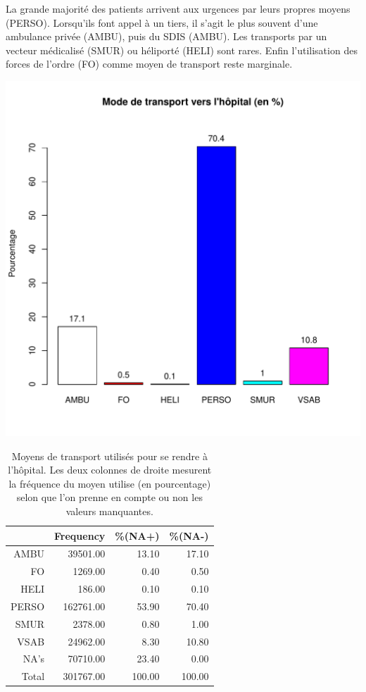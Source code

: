 \documentclass[12pt,english,french,twoside]{report}\usepackage[]{graphicx}\usepackage[]{color}
\makeatletter
\def\maxwidth{ %
  \ifdim\Gin@nat@width>\linewidth
    \linewidth
  \else
    \Gin@nat@width
  \fi
}
\makeatother
\begin{document}
La grande majorité des patients arrivent aux urgences par leurs propres moyens (PERSO). Lorsqu'ils font appel à un tiers, il s'agit le plus souvent d'une ambulance privée (AMBU), puis du SDIS (AMBU). Les transports par un vecteur médicalisé (SMUR) ou héliporté (HELI) sont rares. Enfin l'utilisation des forces de l'ordre (FO) comme moyen de transport reste marginale.


\includegraphics[width=\maxwidth]{figure/transport} 
\begin{table}[ht]
\centering
\begin{tabular}{rrrr}
  \hline
 & Frequency &   \%(NA+) &   \%(NA-) \\ 
  \hline
AMBU & 39501.00 & 13.10 & 17.10 \\ 
  FO & 1269.00 & 0.40 & 0.50 \\ 
  HELI & 186.00 & 0.10 & 0.10 \\ 
  PERSO & 162761.00 & 53.90 & 70.40 \\ 
  SMUR & 2378.00 & 0.80 & 1.00 \\ 
  VSAB & 24962.00 & 8.30 & 10.80 \\ 
  NA's & 70710.00 & 23.40 & 0.00 \\ 
    Total & 301767.00 & 100.00 & 100.00 \\ 
   \hline
\end{tabular}
\caption[Moyens de transport]{Moyens de transport utilisés pour se rendre à l'hôpital. Les deux colonnes de droite mesurent la fréquence du moyen utilise (en pourcentage) selon que l'on prenne en compte ou non les valeurs manquantes. } 
\label{transport}
\end{table}
\end{document}
